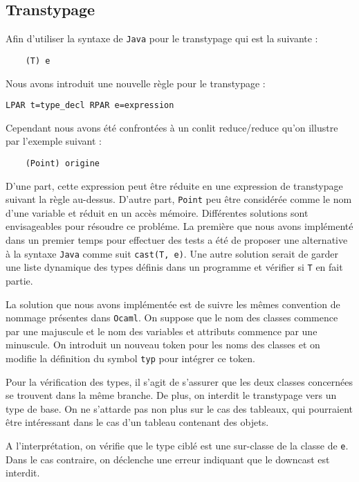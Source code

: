 \documentclass{article}
\begin{document}
\subsection{Transtypage}
Afin d'utiliser la syntaxe de \texttt{Java} pour le transtypage qui est la suivante : 
\begin{verbatim}
    (T) e
\end{verbatim}
Nous avons introduit une nouvelle règle pour le transtypage : 
\begin{lstlisting}[style=mystyle]
    LPAR t=type_decl RPAR e=expression
\end{lstlisting}
Cependant nous avons été confrontées à un conlit reduce/reduce qu'on illustre par l'exemple suivant : 
\begin{verbatim}
    (Point) origine
\end{verbatim}
D'une part, cette expression peut être réduite en une expression de transtypage 
suivant la règle au-dessus. D'autre part, \texttt{Point} peu être considérée comme le nom d'une variable et réduit 
en un accès mémoire. Différentes solutions sont envisageables pour résoudre ce probléme. 
La première que nous avons implémenté dans un premier temps pour effectuer des tests a été de 
proposer une alternative à la syntaxe \texttt{Java} comme suit \texttt{cast(T, e)}.
Une autre solution serait de garder une liste dynamique des types définis dans un programme et vérifier si \texttt{T}
en fait partie.

La solution que nous avons implémentée est de suivre les mêmes convention de nommage présentes dans \texttt{Ocaml}.
On suppose que le nom des classes commence par une majuscule et le nom des variables et attributs commence par une minuscule.
On introduit un nouveau token pour les noms des classes et on modifie la définition du symbol \texttt{typ} pour intégrer ce token.

Pour la vérification des types, il s'agit de s'assurer que les deux classes concernées 
se trouvent dans la même branche. De plus, on interdit le transtypage vers un type de base.
On ne s'attarde pas non plus sur le cas des tableaux, qui pourraient être intéressant dans le cas d'un tableau contenant des objets.

A l'interprétation, on vérifie que le type ciblé est une sur-classe de la classe de \texttt{e}. Dans le cas contraire, on déclenche 
une erreur indiquant que le downcast est interdit.
\end{document}
